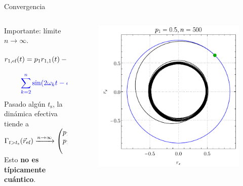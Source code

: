 \begin{frame}{Convergencia}
    \begin{columns}
        \begin{column}{0.5\textwidth}
            Importante: límite $n\rightarrow\infty$. \pause
            \begin{equation}
                \begin{gathered}
                r_{1,\text{ef}}(t)=p_{1}r_{1,1}(t)-p_{\text{np}}r_{\text{np}}{\color{blue}\sum_{k=2}^{n}\sin(2\omega_{k} t-\phi)}\\
                {\color{blue}\sum_{k=2}^{n}\sin(2\omega_{k} t-\phi)}\xrightarrow{n\rightarrow\infty} N(0,\text{std})
                \end{gathered}\nonumber
            \end{equation}\pause
            Pasado algún $t_{\text{s}}$, la dinámica efectiva tiende a\\ \pause
            $\Gamma_{t>t_{\text{s}}}(\vec{r}_{\text{ef}})\xrightarrow{n\rightarrow\infty}\begin{pmatrix}
                p_{1}r_{1,1}(t)\\
                p_{1}r_{2,1}(t)\\
                r_{3}\\
            \end{pmatrix}$\\ \pause
            Esto \textbf{no es típicamente cuántico}.
        \end{column}
        \pause
        \begin{column}{0.5\textwidth}
           \begin{figure}
            \centering
            \includegraphics[width=1.\textwidth]{figures/maxent_results/local_all_ran_p=0.5_r=0.9_n=500_a=-3_b=3.pdf}
           \end{figure}
        \end{column}
    \end{columns}
\end{frame}



